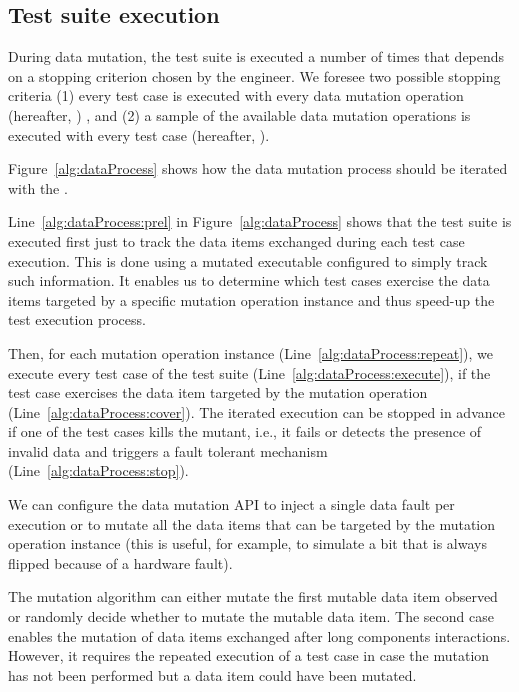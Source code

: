 \clearpage
\subsection{Test suite execution}
\label{sec:mutantsExecution}

During data mutation, the test suite is executed a number of times that depends on a stopping criterion chosen by the engineer. We foresee two possible stopping criteria (1) every test case is executed with every data mutation operation (hereafter, )
, and (2) a sample of the available data mutation operations is executed with every test case (hereafter, ).



Figure~\ref{alg:dataProcess} shows how the data mutation process should be iterated with
 the . 

Line~\ref{alg:dataProcess:prel} in Figure~\ref{alg:dataProcess} shows that the test suite is executed first just to track the data items exchanged during each test case execution. This is done using a mutated executable configured to simply track such information. It enables us to determine which test cases exercise the data items targeted by a specific mutation operation instance and thus speed-up the test execution process.

Then, for each mutation operation instance (Line~\ref{alg:dataProcess:repeat}), we execute every test case of the test suite (Line~\ref{alg:dataProcess:execute}), if the test case exercises the data item targeted by the mutation operation (Line~\ref{alg:dataProcess:cover}).
 The iterated execution can be stopped in advance if one of the test cases kills the mutant, i.e., it fails or detects the presence of invalid data and triggers a fault tolerant mechanism (Line~\ref{alg:dataProcess:stop}).
 
We can configure the data mutation API to inject a single data fault per execution or to mutate all the data items that can be targeted by the mutation operation instance (this is useful, for example, to simulate a bit that is always flipped because of a hardware fault).
 
The mutation algorithm can either mutate the first mutable data item observed or randomly decide whether to mutate the mutable data item. The second case enables the mutation of data items exchanged after long components interactions. However, it requires the repeated execution of a test case in case the mutation has not been performed but a data item could have been mutated. 


